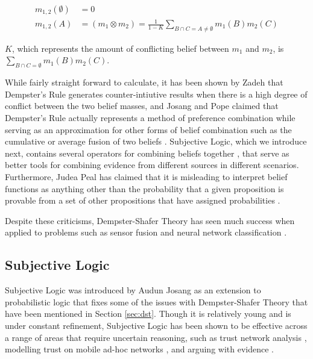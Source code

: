\documentclass[thesis.tex]{subfiles}
\begin{document}
\begin{equation*}
  \begin{split}
    m_{1,2}\left(\emptyset\right) & = 0 \\
    m_{1,2}\left(A\right)         & = \left( m_1 \otimes m_2\right) = \frac{1}{1 - K} \sum_{B \cap C = A \neq \emptyset} m_1(B) m_2(C)
  \end{split}
\end{equation*}

$K$, which represents the amount of conflicting belief between $m_1$ and $m_2$, is $\sum_{B \cap C = \emptyset} m_1(B) m_2(C)$.

While fairly straight forward to calculate, it has been shown by Zadeh \cite{zadeh1979validity, zadeh1986simple}
that Dempster's Rule generates counter-intiutive results when there is a high degree of
conflict between the two belief masses, and Josang and Pope claimed that Dempster's Rule actually
represents a method of preference combination while serving as an approximation for other forms of belief
combination such as the cumulative or average fusion of two beliefs \cite{josang2012dempster}. Subjective Logic, which we introduce next,
contains several operators for combining beliefs together \cite{josang2012interpretation, josang2010cumulative, josang2009fission, josang2009cumulative},
that serve as better tools for combining evidence from different sources in different scenarios.
Furthermore, Judea Peal has claimed that it is misleading to interpret belief functions as anything
other than the probability that a given proposition is provable from a set of other
propositions that have assigned probabilities \cite{pearl1988probabilistic, pearl1988probability, pearl1990reasoning}.

Despite these criticisms, Dempster-Shafer Theory has seen much success when applied to
problems such as sensor fusion \cite{wu2002sensor, murphy1998dempster, basir2007engine} and
neural network classification \cite{denoeux2000neural, rogova1994combining}.




\subsection{Subjective Logic}
\label{sec:subjective-logic-intro}

Subjective Logic was introduced by Audun Josang \cite{josang2001logic} as an
extension to probabilistic logic that fixes some of the issues with
Dempster-Shafer Theory \cite{josang2012dempster} that have been mentioned in Section \ref{sec:dst}.
Though it is relatively young and is under constant refinement,
Subjective Logic has been shown to be effective
across a range of areas that require uncertain reasoning, such as
trust network analysis \cite{josang2006trust, josang2008optimal},
modelling trust on mobile ad-hoc networks \cite{li2004trust, liu2011novel},
and arguing with evidence \cite{oren2007subjective, josang2000legal}.
\end{document}
